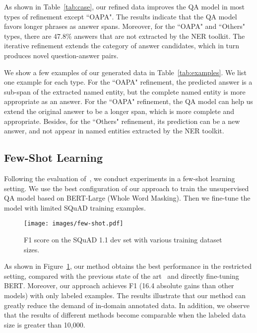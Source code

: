 \documentclass[11pt,a4paper]{article}
\begin{document}
As shown in Table~\ref{tab:case}, our refined data improves the QA model in most types of refinement except ``OAPA".
The results indicate that the QA model favors longer phrases as answer spans.
Moreover, for the ``OAPA" and ``Others" types, there are 47.8\% answers that are not extracted by the NER toolkit.
The iterative refinement extends the category of answer candidates, which in turn produces novel question-answer pairs.

We show a few examples of our generated data in Table~\ref{tab:examples}.
We list one example for each type.
For the ``OAPA" refinement, the predicted answer is a sub-span of the extracted named entity, but the complete named entity is more appropriate as an answer.
For the ``OAPA" refinement, the QA model can help us extend the original answer to be a longer span, which is more complete and appropriate.
Besides, for the ``Others" refinement, its prediction can be a new answer, and not appear in named entities extracted by the NER toolkit. 










\subsection{Few-Shot Learning}

Following the evaluation of~\cite{yang-semiqa,dhingra2019semi}, we conduct experiments in a few-shot learning setting. 
We use the best configuration of our approach to train the unsupervised QA model based on BERT-Large (Whole Word Masking).
Then we fine-tune the model with limited SQuAD training examples.

\begin{figure}[t]
\centering
\texttt{[image: images/few-shot.pdf]}
\caption{F1 score on the SQuAD 1.1 dev set with various training dataset sizes.}
\label{fig:fewshot}
\end{figure}

As shown in Figure~\ref{fig:fewshot}, our method obtains the best performance in the restricted setting, compared with the previous state of the art~\cite{lewis2019unsupervisedqa} and directly fine-tuning BERT.
Moreover, our approach achieves  F1 (16.4 absolute gains than other models) with only  labeled examples.
The results illustrate that our method can greatly reduce the demand of in-domain annotated data.
In addition, we observe that the results of different methods become comparable when the labeled data size is greater than 10,000.
\end{document}
